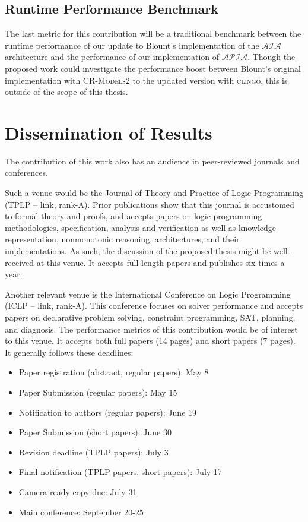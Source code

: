 \subsection{Runtime Performance Benchmark}

The last metric for this contribution will be a traditional benchmark between the runtime performance of our update to Blount's implementation of the $\mathcal{AIA}$ architecture and the performance of our implementation of $\mathcal{APIA}$.
Though the proposed work could investigate the performance boost between Blount's original implementation with \textsc{CR-Models2} to the updated version with \textsc{clingo}, this is outside of the scope of this thesis.

\section{Dissemination of Results}

The contribution of this work also has an audience in peer-reviewed journals and conferences.

Such a venue would be the Journal of Theory and Practice of Logic Programming (TPLP – link, rank-A).
Prior publications show that this journal is accustomed to formal theory and proofs, and accepts papers on logic programming methodologies, specification, analysis and verification as well as knowledge representation, nonmonotonic reasoning, architectures, and their implementations.
As such, the discussion of the proposed thesis might be well-received at this venue.
It accepts full-length papers and publishes six times a year.

Another relevant venue is the International Conference on Logic Programming (ICLP – link, rank-A).
This conference focuses on solver performance and accepts papers on declarative problem solving, constraint programming, SAT, planning, and diagnosis.
The performance metrics of this contribution would be of interest to this venue.
It accepts both full papers (14 pages) and short papers (7 pages).
It generally follows these deadlines:

\begin{itemize}
    \item Paper registration (abstract, regular papers): May 8
    \item Paper Submission (regular papers): May 15
    \item Notification to authors (regular papers): June 19
    \item Paper Submission (short papers): June 30
    \item Revision deadline (TPLP papers): July 3
    \item Final notification (TPLP papers, short papers): July 17
    \item Camera-ready copy due: July 31
    \item Main conference: September 20-25
\end{itemize}

